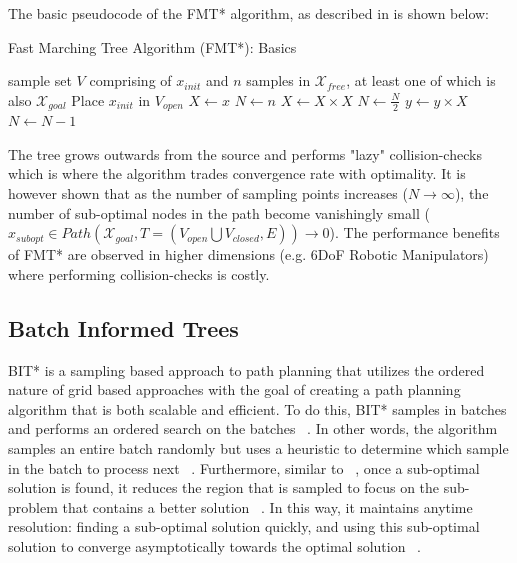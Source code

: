 \documentclass{article}
\begin{document}
The basic pseudocode of the FMT* algorithm, as described in \cite{FMT} is shown below:

\begin{algorithm}
\caption{Fast Marching Tree Algorithm (FMT*): Basics}\label{alg:fmt}
	\begin{algorithmic}[1]
		\Require sample set $V$ comprising of $x_{init}$ and $n$ samples in $\mathcal{X}_{free}$, at least one of which is also $\mathcal{X}_{goal}$
		\State Place $x_{init}$ in $V_{open}$
		\State $X \gets x$
		\State $N \gets n$
			\State $X \gets X \times X$
			\State $N \gets \frac{N}{2}$  
			\State $y \gets y \times X$
			\State $N \gets N - 1$
		\EndIf
		\EndWhile
	\end{algorithmic}
\end{algorithm}


The tree grows outwards from the source and performs "lazy" collision-checks which is where the algorithm trades convergence rate with optimality. It is however shown that as the number of sampling points increases ($N \to \infty$), the number of sub-optimal nodes in the path become vanishingly small ($ x_{subopt} \in Path(\mathcal{X}_{goal}, T = (V_{open} \bigcup V_{closed}, E)) \to 0 $). The performance benefits of FMT* are observed in higher dimensions (e.g. 6DoF Robotic Manipulators) where performing collision-checks is costly.

\subsection{Batch Informed Trees}
BIT* is a sampling based approach to path planning that utilizes the ordered nature of grid based approaches with the goal of creating a path planning algorithm that is both scalable and efficient. To do this, BIT* samples in batches and performs an ordered search on the batches ~\citep{BIT*}. In other words, the algorithm samples an entire batch randomly but uses a heuristic to determine which sample in the batch to process next ~\citep{BIT*}. Furthermore, similar to ~\citep{irrt}, once a sub-optimal solution is found, it reduces the region that is sampled to focus on the sub-problem that contains a better solution ~\citep{BIT*}. In this way, it maintains anytime resolution: finding a sub-optimal solution quickly, and using this sub-optimal solution to converge asymptotically towards the optimal solution ~\citep{BIT*}.
\end{document}
